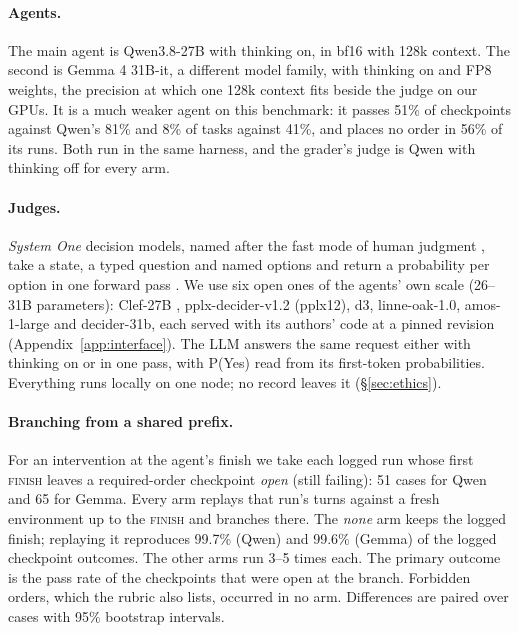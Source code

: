 \documentclass[11pt]{article}
\begin{document}
\paragraph{Agents.} The main agent is Qwen3.8-27B \citep{qwen38} with thinking on, in bf16 with 128k context. The
second is Gemma 4 31B-it, a different model family, with thinking on and FP8 weights, the precision at which one 128k
context fits beside the judge on our GPUs. It is a much weaker agent on this benchmark: it passes 51\% of checkpoints
against Qwen's 81\% and 8\% of tasks against 41\%, and places no order in 56\% of its runs. Both run in the same
harness, and the grader's judge is Qwen with thinking off for every arm.

\paragraph{Judges.} \emph{System One} decision models, named after the fast mode of human judgment
\citep{kahneman2011thinking}, take a state, a typed question and named options and return a probability per option in
one forward pass \citep{typesafe2026jev,clef2026}. We use six open ones of the agents' own scale (26--31B parameters):
Clef-27B \citep{clef2026}, pplx-decider-v1.2 (pplx12), d3, linne-oak-1.0, amos-1-large and decider-31b, each served
with its authors' code at a pinned revision (Appendix~\ref{app:interface}). The LLM answers the same request either
with thinking on or in one pass, with P(Yes) read from its first-token probabilities. Everything runs locally on one
node; no record leaves it (\S\ref{sec:ethics}).

\paragraph{Branching from a shared prefix.} For an intervention at the agent's finish we take each logged run whose
first \textsc{finish} leaves a required-order checkpoint \emph{open} (still failing): 51 cases for Qwen and 65 for
Gemma. Every arm replays that run's turns against a fresh environment up to the \textsc{finish} and branches there.
The \emph{none} arm keeps the logged finish; replaying it reproduces 99.7\% (Qwen) and 99.6\% (Gemma) of the logged
checkpoint outcomes. The other arms run 3--5 times each. The primary outcome is the pass rate of the checkpoints that
were open at the branch. Forbidden orders, which the rubric also lists, occurred in no arm. Differences are paired
over cases with 95\% bootstrap intervals.
\end{document}
